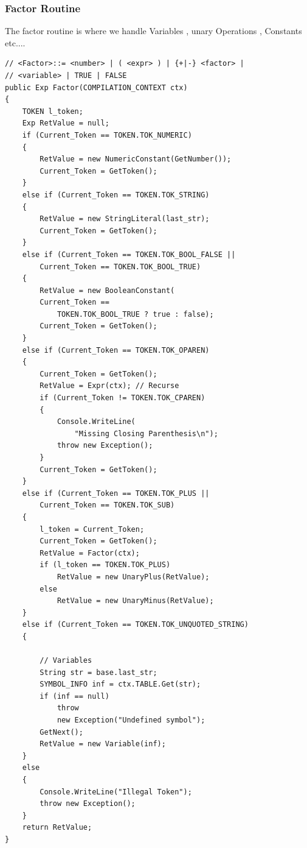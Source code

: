 \subsubsection{Factor Routine}
The factor routine is where we handle Variables , unary Operations , Constants etc....
\lstset{style=csharp}
\begin{lstlisting}
// <Factor>::= <number> | ( <expr> ) | {+|-} <factor> |
// <variable> | TRUE | FALSE
public Exp Factor(COMPILATION_CONTEXT ctx)
{
	TOKEN l_token;
	Exp RetValue = null;
	if (Current_Token == TOKEN.TOK_NUMERIC)
	{
		RetValue = new NumericConstant(GetNumber());
		Current_Token = GetToken();
	}
	else if (Current_Token == TOKEN.TOK_STRING)
	{
		RetValue = new StringLiteral(last_str);
		Current_Token = GetToken();
	}
	else if (Current_Token == TOKEN.TOK_BOOL_FALSE ||
		Current_Token == TOKEN.TOK_BOOL_TRUE)
	{
		RetValue = new BooleanConstant(
		Current_Token == 
			TOKEN.TOK_BOOL_TRUE ? true : false);
		Current_Token = GetToken();
	}
	else if (Current_Token == TOKEN.TOK_OPAREN)
	{
		Current_Token = GetToken();
		RetValue = Expr(ctx); // Recurse
		if (Current_Token != TOKEN.TOK_CPAREN)
		{
			Console.WriteLine(
				"Missing Closing Parenthesis\n");
			throw new Exception();
		}
		Current_Token = GetToken();
	}
	else if (Current_Token == TOKEN.TOK_PLUS || 
		Current_Token == TOKEN.TOK_SUB)
	{
		l_token = Current_Token;
		Current_Token = GetToken();
		RetValue = Factor(ctx);
		if (l_token == TOKEN.TOK_PLUS)
			RetValue = new UnaryPlus(RetValue);
		else
			RetValue = new UnaryMinus(RetValue);
	}
	else if (Current_Token == TOKEN.TOK_UNQUOTED_STRING)
	{
		
		// Variables
		String str = base.last_str;
		SYMBOL_INFO inf = ctx.TABLE.Get(str);
		if (inf == null)
			throw 
			new Exception("Undefined symbol");
		GetNext();
		RetValue = new Variable(inf);
	}
	else
	{
		Console.WriteLine("Illegal Token");
		throw new Exception();
	}
	return RetValue;
}
\end{lstlisting}
